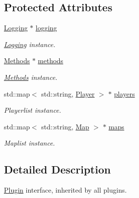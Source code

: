 \subsection*{Protected Attributes}
\begin{DoxyCompactItemize}
\item 
\hypertarget{classPlugin_a790b0b546d265519adca0ddac1ff0fec}{\hyperlink{classLogging}{Logging} $\ast$ \hyperlink{classPlugin_a790b0b546d265519adca0ddac1ff0fec}{logging}}\label{classPlugin_a790b0b546d265519adca0ddac1ff0fec}

\begin{DoxyCompactList}\small\item\em \hyperlink{classLogging}{Logging} instance. \end{DoxyCompactList}\item 
\hypertarget{classPlugin_afe1621fbf28d04912837a18817170e62}{\hyperlink{classMethods}{Methods} $\ast$ \hyperlink{classPlugin_afe1621fbf28d04912837a18817170e62}{methods}}\label{classPlugin_afe1621fbf28d04912837a18817170e62}

\begin{DoxyCompactList}\small\item\em \hyperlink{classMethods}{Methods} instance. \end{DoxyCompactList}\item 
\hypertarget{classPlugin_a5821fc98f348a93156dd76dfb84d3eb3}{std\-::map$<$ std\-::string, \hyperlink{structPlayer}{Player} $>$ $\ast$ \hyperlink{classPlugin_a5821fc98f348a93156dd76dfb84d3eb3}{players}}\label{classPlugin_a5821fc98f348a93156dd76dfb84d3eb3}

\begin{DoxyCompactList}\small\item\em Playerlist instance. \end{DoxyCompactList}\item 
\hypertarget{classPlugin_a7f1ac74d4f6512342f229faf7dad27b2}{std\-::map$<$ std\-::string, \hyperlink{structMap}{Map} $>$ $\ast$ \hyperlink{classPlugin_a7f1ac74d4f6512342f229faf7dad27b2}{maps}}\label{classPlugin_a7f1ac74d4f6512342f229faf7dad27b2}

\begin{DoxyCompactList}\small\item\em Maplist instance. \end{DoxyCompactList}\end{DoxyCompactItemize}


\subsection{Detailed Description}
\hyperlink{classPlugin}{Plugin} interface, inherited by all plugins. 

